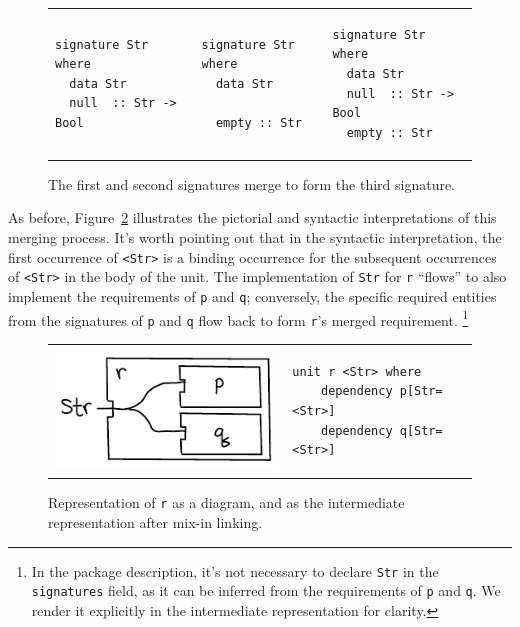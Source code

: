 \begin{figure}
\begin{tabular}{p{} p{} p{}}
\begin{verbatim}
signature Str where
  data Str
  null  :: Str -> Bool
\end{verbatim}
&
\begin{verbatim}
signature Str where
  data Str

  empty :: Str
\end{verbatim}
&
\begin{verbatim}
signature Str where
  data Str
  null  :: Str -> Bool
  empty :: Str
\end{verbatim}
\end{tabular}
\caption{The first and second signatures merge to form the third signature.}
\label{fig:signature-merging}
\end{figure}

As before, Figure~\ref{fig:signature-merging-interp} illustrates the
pictorial and syntactic interpretations of this merging process.  It's
worth pointing out that in the syntactic interpretation, the first
occurrence of \verb|<Str>| is a binding occurrence for the subsequent
occurrences of \verb|<Str>| in the body of the unit.  The implementation
of \verb|Str| for \verb|r| ``flows'' to also implement the requirements
of \verb|p| and \verb|q|; conversely, the specific required entities
from the signatures of \verb|p| and \verb|q| flow back to form \verb|r|'s
merged requirement.%
%
\footnote{In the package description, it's not necessary to declare \texttt{Str}
in the \texttt{signatures} field, as it can be inferred from the requirements
of \texttt{p} and \texttt{q}.  We render it explicitly in the intermediate
representation for clarity.}

\begin{figure}
\begin{tabular}{p{} p{}}
\center\includegraphics{figures/p-q-merge-Str.pdf}
&
\vspace{2em}
\begin{verbatim}
unit r <Str> where
    dependency p[Str=<Str>]
    dependency q[Str=<Str>]
\end{verbatim}
\end{tabular}
\caption{Representation of \texttt{r} as a diagram, and as the intermediate
representation after mix-in linking.}
\label{fig:signature-merging-interp}
\end{figure}

